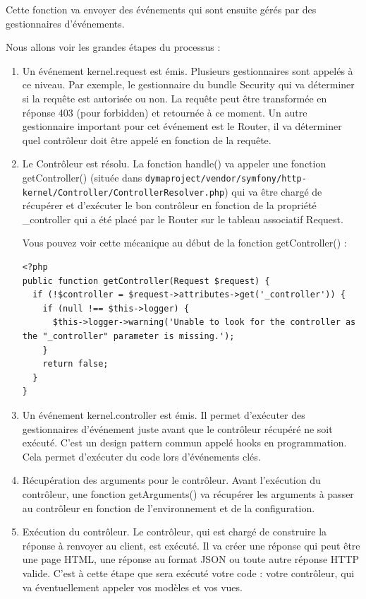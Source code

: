 \documentclass{article}
\begin{document}
Cette fonction va envoyer des événements qui sont ensuite gérés par des gestionnaires d'événements.

Nous allons voir les grandes étapes du processus :

\begin{enumerate}
\item Un événement kernel.request est émis. Plusieurs gestionnaires sont appelés à ce niveau. Par exemple, le gestionnaire du bundle Security qui va déterminer si la requête est autorisée ou non. La requête peut être transformée en réponse 403 (pour forbidden) et retournée à ce moment. Un autre gestionnaire important pour cet événement est le Router, il va déterminer quel contrôleur doit être appelé en fonction de la requête.

\item  Le Contrôleur est résolu. La fonction handle() va appeler une fonction getController() (située dans {\tt dymaproject/vendor/symfony/http-kernel/Controller/ControllerResolver.php}) qui va être chargé de récupérer et d'exécuter le bon contrôleur en fonction de la propriété \_controller qui a été placé par le Router sur le tableau associatif Request.

Vous pouvez voir cette mécanique au début de la fonction getController() :
\begin{verbatim}
<?php
public function getController(Request $request) {
  if (!$controller = $request->attributes->get('_controller')) {
    if (null !== $this->logger) {
      $this->logger->warning('Unable to look for the controller as the "_controller" parameter is missing.');
    }
    return false;
  }
}
\end{verbatim}
\item  Un événement kernel.controller est émis. Il permet d'exécuter des gestionnaires d'événement juste avant que le contrôleur récupéré ne soit exécuté. C'est un design pattern commun appelé hooks en programmation. Cela permet d'exécuter du code lors d'événements clés.

\item  Récupération des arguments pour le contrôleur. Avant l'exécution du contrôleur, une fonction getArguments() va récupérer les arguments à passer au contrôleur en fonction de l'environnement et de la configuration.

\item  Exécution du contrôleur. Le contrôleur, qui est chargé de construire la réponse à renvoyer au client, est exécuté. Il va créer une réponse qui peut être une page HTML, une réponse au format JSON ou toute autre réponse HTTP valide. C'est à cette étape que sera exécuté votre code : votre contrôleur, qui va éventuellement appeler vos modèles et vos vues.


\end{enumerate}
\end{document}
